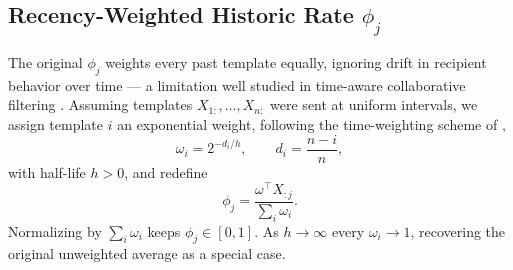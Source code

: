 \subsection{Recency-Weighted Historic Rate $\phi_j$}
\label{sec:recency-phi}

The original $\phi_j$ weights every past template equally, ignoring drift
in recipient behavior over time --- a limitation well studied in
time-aware collaborative filtering \citep{ding2005time,koren2009collaborative}.
Assuming templates
$X_{1:},\dots,X_{n:}$ were sent at uniform intervals, we assign template
$i$ an exponential weight, following the time-weighting scheme of
\citet{ding2005time},
\begin{equation}
\label{eq:omega}
\omega_i = 2^{-d_i/h}, \qquad d_i = \frac{n-i}{n},
\end{equation}
with half-life $h>0$, and redefine
\begin{equation}
\label{eq:phi-weighted}
\phi_j = \frac{\omega^\top X_{:j}}{\sum_i \omega_i}.
\end{equation}
Normalizing by $\sum_i\omega_i$ keeps $\phi_j\in[0,1]$. As $h\to\infty$
every $\omega_i\to1$, recovering the original unweighted average as a
special case.

